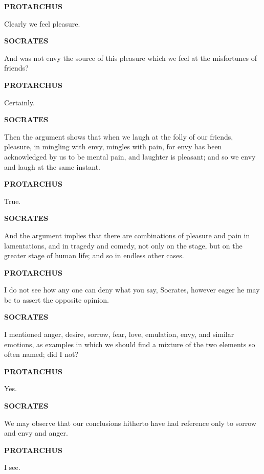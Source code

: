 \documentclass[11pt,letter]{article}
\begin{document}
\par \textbf{PROTARCHUS}
\par   Clearly we feel pleasure.

\par \textbf{SOCRATES}
\par   And was not envy the source of this pleasure which we feel at the misfortunes of friends?

\par \textbf{PROTARCHUS}
\par   Certainly.

\par \textbf{SOCRATES}
\par   Then the argument shows that when we laugh at the folly of our friends, pleasure, in mingling with envy, mingles with pain, for envy has been acknowledged by us to be mental pain, and laughter is pleasant; and so we envy and laugh at the same instant.

\par \textbf{PROTARCHUS}
\par   True.

\par \textbf{SOCRATES}
\par   And the argument implies that there are combinations of pleasure and pain in lamentations, and in tragedy and comedy, not only on the stage, but on the greater stage of human life; and so in endless other cases.

\par \textbf{PROTARCHUS}
\par   I do not see how any one can deny what you say, Socrates, however eager he may be to assert the opposite opinion.

\par \textbf{SOCRATES}
\par   I mentioned anger, desire, sorrow, fear, love, emulation, envy, and similar emotions, as examples in which we should find a mixture of the two elements so often named; did I not?

\par \textbf{PROTARCHUS}
\par   Yes.

\par \textbf{SOCRATES}
\par   We may observe that our conclusions hitherto have had reference only to sorrow and envy and anger.

\par \textbf{PROTARCHUS}
\par   I see.
\end{document}

